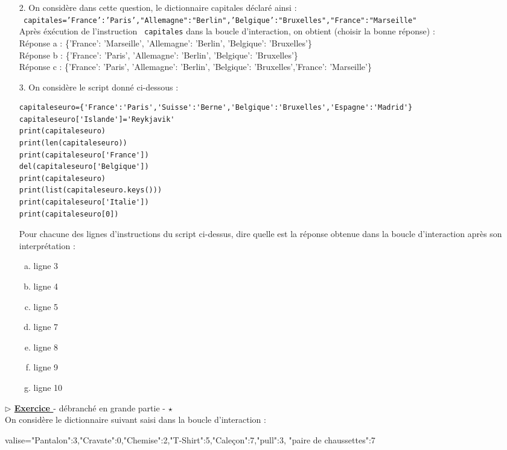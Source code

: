 \documentclass[12pt,french]{article}
\newcounter{npb}
\newcommand{\exo}{
    \stepcounter{npb}
    {\textbf{$\triangleright$ \underline{Exercice \arabic{npb} }}}
}
\begin{document}
\normalsize
\begin{enumerate}
\item[2.] On considère dans cette question, le dictionnaire capitales déclaré ainsi :\\
\texttt{ capitales={'France':'Paris',"Allemagne":"Berlin",'Belgique':"Bruxelles","France":"Marseille"}}\\ 
Après éxécution de l'instruction  \texttt{ capitales} dans la boucle d'interaction, on obtient (choisir la bonne réponse) :\\
Réponse a : \{'France': 'Marseille', 'Allemagne': 'Berlin', 'Belgique': 'Bruxelles'\}\\
Réponse b : \{'France': 'Paris', 'Allemagne': 'Berlin', 'Belgique': 'Bruxelles'\}\\
Réponse c : \{'France': 'Paris', 'Allemagne': 'Berlin', 'Belgique': 'Bruxelles','France': 'Marseille'\}
\item[3.] On considère le script donné ci-dessous :
\begin{verbatim}
capitaleseuro={'France':'Paris','Suisse':'Berne','Belgique':'Bruxelles','Espagne':'Madrid'}
capitaleseuro['Islande']='Reykjavik'
print(capitaleseuro)
print(len(capitaleseuro))
print(capitaleseuro['France'])
del(capitaleseuro['Belgique'])
print(capitaleseuro)
print(list(capitaleseuro.keys()))
print(capitaleseuro['Italie'])
print(capitaleseuro[0])
\end{verbatim}
Pour chacune des lignes d'instructions du script ci-dessus, dire quelle est la réponse obtenue dans la boucle d'interaction après son interprétation :
\begin{multicols}{4}
\begin{enumerate}[(a)]
\item ligne 3 
\item ligne 4
\item ligne 5
\item ligne 7
\item  ligne 8
\item ligne 9
\item ligne 10 
\end{enumerate}
\end{multicols}
\end{enumerate}
\exo - débranché en grande partie - $\star$\\
On considère le dictionnaire suivant saisi dans la boucle d'interaction :
\begin{tcolorbox}[enhanced,
	colback=blue!5!white,colframe=blue!75!black]	
\begin{pyconsole}
valise={"Pantalon":3,"Cravate":0,"Chemise":2,"T-Shirt":5,"Caleçon":7,"pull":3,
	"paire de chaussettes":7}
\end{pyconsole}
\end{tcolorbox}
\end{document}
